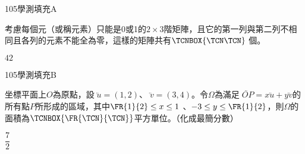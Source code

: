 \begin{QUESTIONS}
    \begin{QUESTION}
        \begin{ExamInfo}{105}{學測}{填充}{A}
        \end{ExamInfo}
        \begin{ExamAnsRateInfo}{22}{47}{16}{3}
        \end{ExamAnsRateInfo}
        \begin{QBODY}
            考慮每個元（或稱元素）只能是0或1的$2\times 3$階矩陣，且它的第一列與第二列不相同且各列的元素不能全為零，這樣的矩陣共有$\TCNBOX{\TCN\TCN}$ 個。
        \end{QBODY}
        \begin{QFROMS}
        \end{QFROMS}
        \begin{QTAGS}\end{QTAGS}
        \begin{QANS}
            $42$
        \end{QANS}
        \begin{QSOLLIST}
        \end{QSOLLIST}
        \begin{QEMPTYSPACE}
        \end{QEMPTYSPACE}
    \end{QUESTION}
    \begin{QUESTION}
        \begin{ExamInfo}{105}{學測}{填充}{B}
        \end{ExamInfo}
        \begin{ExamAnsRateInfo}{22}{54}{11}{1}
        \end{ExamAnsRateInfo}
        \begin{QBODY}
            坐標平面上$O$為原點，設$\lvec{u}$$=(1,2)$、$\lvec{v}=(3,4)$。令$\Omega $為滿足$\lvec{OP}=x\lvec{u}+y\lvec{v}$的所有點$P$所形成的區域，其中$\FR{1}{2}\le x\le 1\ $、$-3\le y\le \FR{1}{2}$，則$\Omega $的面積為$\TCNBOX{\FR{\TCN}{\TCN}}$平方單位。（化成最簡分數）
        \end{QBODY}
        \begin{QFROMS}
        \end{QFROMS}
        \begin{QTAGS}\end{QTAGS}
        \begin{QANS}
            $\dfrac{7}{2}$

\end{QANS}
\end{QUESTION}
\end{QUESTIONS}

